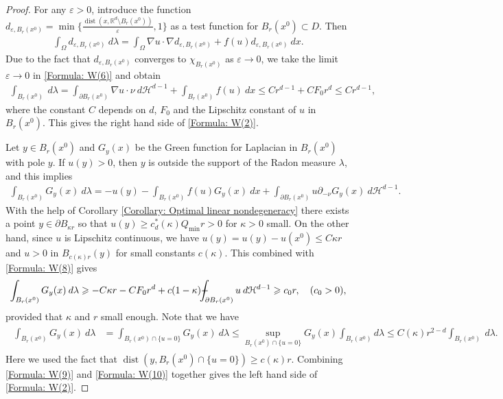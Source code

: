\documentclass[11pt,reqno]{amsart}
\begin{document}
\begin{proof}
    For any $\varepsilon>0$, introduce the function $d_{\varepsilon,B_{r}(x^{0})}=\min\{\tfrac{\operatorname{dist}(x,\mathbb{R}^{d}\setminus B_{r}(x^{0}))}{\varepsilon},1\}$ as a test function for $B_{r}(x^{0})\subset D$. Then
    \begin{align}\label{Formula: W(6)}
    	\int_{\Omega}d_{\varepsilon,B_{r}(x^{0})}\:d\lambda=\int_{\Omega}\nabla u\cdot\nabla d_{\varepsilon,B_{r}(x^{0})}+f(u)d_{\varepsilon,B_{r}(x^{0})}\:dx.
    \end{align}
    Due to the fact that $d_{\varepsilon,B_{r}(x^{0})}$ converges to $\chi_{B_{r}(x^{0})}$ as $\varepsilon\to0$, we take the limit $\varepsilon\to0$ in \eqref{Formula: W(6)} and obtain
    \begin{align}\label{Formula: W(7)}
    	\int_{B_{r}(x^{0})}\:d\lambda=\int_{\partial B_{r}(x^{0})}\nabla u\cdot\nu\:d\mathcal{H}^{d-1}+\int_{B_{r}(x^{0})}f(u)\:dx\leqslant Cr^{d-1}+CF_{0}r^{d}\leqslant Cr^{d-1},
    \end{align}
    where the constant $C$ depends on $d$, $F_{0}$ and the Lipschitz constant of $u$ in $B_{r}(x^{0})$. This gives the right hand side of \eqref{Formula: W(2)}.
    
    Let $y\in B_{r}(x^{0})$ and $G_{y}(x)$ be the Green function for Laplacian in $B_{r}(x^{0})$ with pole $y$. If $u(y)>0$, then $y$ is outside the support of the Radon measure $\lambda$, and this implies
    \begin{align}\label{Formula: W(8)}
    	\int_{B_{r}(x^{0})}G_{y}(x)\:d\lambda=-u(y)-\int_{B_{r}(x^{0})}f(u)G_{y}(x)\:dx+\int_{\partial B_{r}(x^{0})}u\partial_{-\nu}G_{y}(x)\:d\mathcal{H}^{d-1}.
    \end{align}
    With the help of Corollary \ref{Corollary: Optimal linear nondegeneracy} there exists a point $y\in\partial B_{\kappa r}$ so that $u(y)\geqslant c_{d}^{*}(\kappa)Q_{\mathrm{min}}r>0$ for $\kappa>0$ small. On the other hand, since $u$ is Lipschitz continuous, we have $u(y)=u(y)-u(x^{0})\leqslant C\kappa r$ and $u>0$ in $B_{c(\kappa)r}(y)$ for small constants $c(\kappa)$. This combined with \eqref{Formula: W(8)} gives
    \begin{align}\label{Formula: W(9)}
    	\int_{B_{r}(x^{0})}G_{y}(x)\:d\lambda\geqslant-C\kappa r-CF_{0}r^{d}+c(1-\kappa)\dashint_{\partial B_{r}(x^{0})}u\:d\mathcal{H}^{d-1}\geqslant c_{0}r,\quad(c_{0}>0),
    \end{align}
    provided that $\kappa$ and $r$ small enough. Note that we have
    \begin{align}\label{Formula: W(10)}
    	\begin{alignedat}{2}
    		\int_{B_{r}(x^{0})}G_{y}(x)\:d\lambda&=\int_{B_{r}(x^{0})\cap\{u=0\}}G_{y}(x)\:d\lambda\leqslant\sup_{B_{r}(x^{0})\cap\{u=0\}}G_{y}(x)\int_{B_{r}(x^{0})}d\lambda\leqslant C(\kappa)r^{2-d}\int_{B_{r}(x^{0})}\:d\lambda.
    	\end{alignedat}
    \end{align}
    Here we used the fact that $\operatorname{dist}(y,B_{r}(x^{0})\cap\{u=0\})\geqslant c(\kappa)r$. Combining \eqref{Formula: W(9)} and \eqref{Formula: W(10)} together gives the left hand side of \eqref{Formula: W(2)}.
    

\end{proof}
\end{document}
